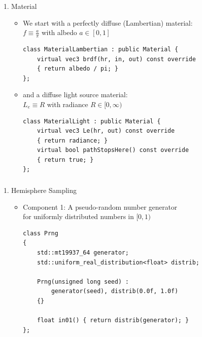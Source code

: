 \documentclass[utf8,stillsansserifmath,fleqn,t]{beamer}
\newcommand{\labelname}[1]{\def\insertenumlabel{#1}\usebeamertemplate{enumerate item}}
\begin{document}
\begin{frame}[fragile]
\frametitle{\insertsection}
\begin{enumerate}
\item[\labelname{4}] Material
\begin{itemize}
\item We start with a perfectly diffuse (Lambertian) material:\\
$f\equiv \frac{a}{\pi}$ with albedo $a\in[0,1]$
\begin{lstlisting}
class MaterialLambertian : public Material {
    virtual vec3 brdf(hr, in, out) const override
    { return albedo / pi; }
};
\end{lstlisting}
\item and a diffuse light source material:\\
    $L_e \equiv R$ with radiance $R\in[0,\infty)$
\begin{lstlisting}
class MaterialLight : public Material {
    virtual vec3 Le(hr, out) const override
    { return radiance; }
    virtual bool pathStopsHere() const override
    { return true; }
};
\end{lstlisting}
\end{itemize}
\end{enumerate}
\end{frame}

\begin{frame}[fragile]
\frametitle{\insertsection}
\begin{enumerate}
\item[\labelname{5}] Hemisphere Sampling
\begin{itemize}
\item Component 1: A pseudo-random number generator\\
for uniformly distributed numbers in $[0,1)$
\begin{lstlisting}
class Prng
{
    std::mt19937_64 generator;
    std::uniform_real_distribution<float> distrib;

    Prng(unsigned long seed) :
        generator(seed), distrib(0.0f, 1.0f)
    {}

    float in01() { return distrib(generator); }
};
\end{lstlisting}
\end{itemize}
\end{enumerate}
\end{frame}
\end{document}
